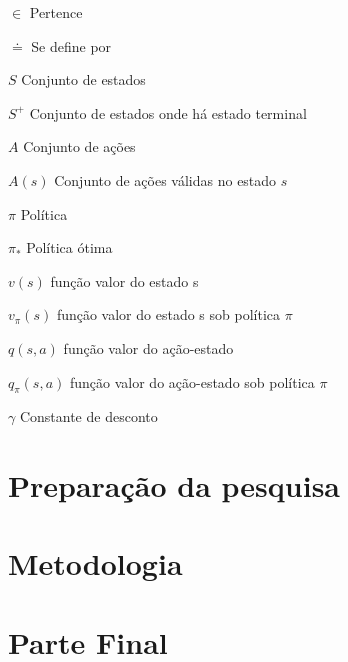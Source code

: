\documentclass[
	12pt,					%
	openright,				%
	twoside,					%
	a4paper,					%
	english,					%
	brazil					%
	]{abntex2}
\begin{document}
\begin{simbolos}
	\item[$ \in $] Pertence
	\item[$ \doteq $] Se define por
	\item[$ S $] Conjunto de estados
	\item[$ S^+ $] Conjunto de estados onde há estado terminal
	\item[$ A $] Conjunto de ações
	\item[$ A(s) $] Conjunto de ações válidas no estado $s$
	\item[$ \pi $] Política
	\item[$ \pi_\ast $] Política ótima
	\item[$ v(s) $] função valor do estado s
	\item[$ v_\pi(s) $] função valor do estado s sob política $\pi$
	\item[$ q(s,a) $] função valor do ação-estado
	\item[$ q_\pi(s,a) $] função valor do ação-estado sob política $\pi$
	\item[$ \gamma $] Constante de desconto
\end{simbolos}

\tableofcontents*
\cleardoublepage

\textual
\setcounter{page}{1}



\part{Preparação da pesquisa}



\part{Metodologia}



\part{Parte Final}


\end{document}
